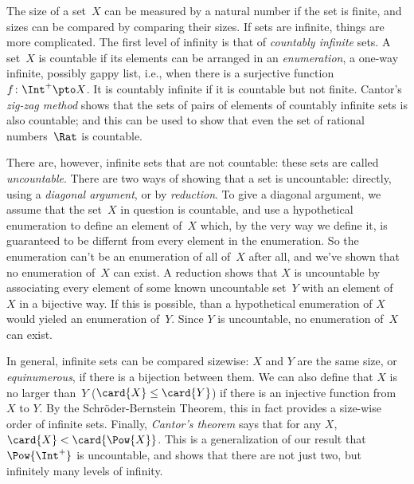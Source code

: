 The size of a set~$X$ can be measured by a natural number if the set
is finite, and sizes can be compared by comparing their sizes. If sets
are infinite, things are more complicated.  The first level of
infinity is that of \emph{countably infinite} sets. A set~$X$ is
countable if its elements can be arranged in an \emph{enumeration}, a
one-way infinite, possibly gappy list, i.e., when there is a
surjective function~$f\colon \Int^+ \pto X$. It is countably infinite
if it is countable but not finite. Cantor's \emph{zig-zag method}
shows that the sets of pairs of elements of countably infinite sets is
also countable; and this can be used to show that even the set of
rational numbers~$\Rat$ is countable.

There are, however, infinite sets that are not countable: these sets
are called \emph{uncountable}. There are two ways of showing that a
set is uncountable: directly, using a \emph{diagonal argument}, or by
\emph{reduction}. To give a diagonal argument, we assume that the
set~$X$ in question is countable, and use a hypothetical enumeration
to define an element of~$X$ which, by the very way we define it, is
guaranteed to be differnt from every element in the enumeration. So
the enumeration can't be an enumeration of all of~$X$ after all, and
we've shown that no enumeration of~$X$ can exist.  A reduction shows
that $X$ is uncountable by associating every element of some known
uncountable set~$Y$ with an element of~$X$ in a bijective way. If this
is possible, than a hypothetical enumeration of $X$ would yieled an
enumeration of~$Y$. Since $Y$ is uncountable, no enumeration of~$X$
can exist.

In general, infinite sets can be compared sizewise: $X$ and $Y$ are
the same size, or \emph{equinumerous}, if there is a bijection between
them. We can also define that $X$ is no larger than~$Y$ ($\card{X} \le
\card{Y}$) if there is an injective function from $X$ to
$Y$. By the Schr\"oder-Bernstein Theorem, this in fact provides a
size-wise order of infinite sets.  Finally, \emph{Cantor's theorem}
says that for any $X$, $\card{X} < \card{\Pow{X}}$. This is a
generalization of our result that $\Pow{\Int^+}$ is uncountable, and
shows that there are not just two, but infinitely many levels of
infinity.
